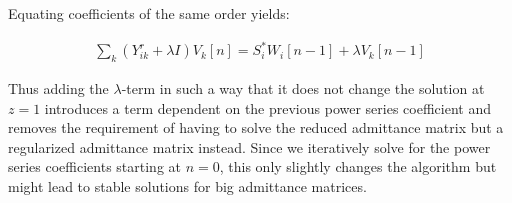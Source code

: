 \documentclass[11pt]{cmuthesis} %
\begin{document}
Equating coefficients of the same order yields:

\begin{align}
\sum_k (Y^r_{ik} + \lambda I)  V_k[n] = S_i^*W_i[n - 1] + \lambda V_k[n-1] \label{eq:scale_embed}
\end{align}

Thus adding the $\lambda$-term in such a way that it does not change the solution at $z=1$ introduces a term dependent on the previous power series coefficient and removes the requirement of having to solve the reduced admittance matrix but a regularized admittance matrix instead. Since we iteratively solve for the power series coefficients starting at $n=0$, this only slightly changes the algorithm but might lead to stable solutions for big admittance matrices.




\end{document}
